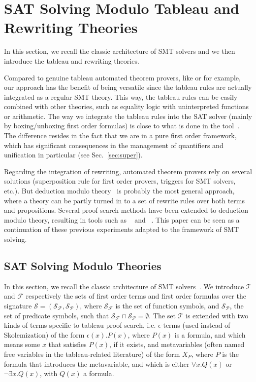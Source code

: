
\section{SAT Solving Modulo Tableau and Rewriting Theories}
\label{sec:smt}

In this section, we recall the classic architecture of SMT solvers and we then
introduce the tableau and rewriting theories.

Compared to genuine tableau automated theorem provers, like \princess{} or
\zenon{} for example, our approach has the benefit of being versatile since the
tableau rules are actually integrated as a regular SMT theory. This way, the
tableau rules can be easily combined with other theories, such as equality logic
with uninterpreted functions or arithmetic. The way we integrate the tableau
rules into the SAT solver (mainly by boxing/unboxing first order formulas) is
close to what is done in the \satallax{} tool~\cite{CEB12}. The difference
resides in the fact that we are in a pure first order framework, which has
significant consequences in the management of quantifiers and unification in
particular (see Sec.~\ref{sec:super}).

Regarding the integration of rewriting, automated theorem provers rely on
several solutions (superposition rule for first order provers, triggers for SMT
solvers, etc.). But deduction modulo theory~\cite{DA03} is probably the most
general approach, where a theory can be partly turned in to a set of rewrite
rules over both terms and propositions. Several proof search methods have been
extended to deduction modulo theory, resulting in tools such as
\iproverm{}~\cite{GB11} and \zenm{}~\cite{Zenon-Modulo}. This paper can be seen
as a continuation of these previous experiments adapted to the framework of SMT
solving.

\subsection{SAT Solving Modulo Theories}

In this section, we recall the classic architecture of SMT
solvers~\cite{BEA06}. We introduce $\mathcal{T}$ and $\mathcal{F}$ respectively
the sets of first order terms and first order formulas over the signature
$\mathcal{S}=(\mathcal{S}_\mathcal{F},\mathcal{S}_\mathcal{P})$, where
$\mathcal{S}_\mathcal{F}$ is the set of function symbols, and
$\mathcal{S}_\mathcal{P}$, the set of predicate symbols, such that
$\mathcal{S}_\mathcal{F}\cap\mathcal{S}_\mathcal{P}=\emptyset$. The set
$\mathcal{T}$ is extended with two kinds of terms specific to tableau proof
search, i.e. $\epsilon{}$-terms (used instead of Skolemization) of the form
$\epsilon(x).P(x)$, where $P(x)$ is a formula, and which means some $x$ that
satisfies $P(x)$, if it exists, and metavariables (often named free variables in
the tableau-related literature) of the form $X_P$, where $P$ is the formula that
introduces the metavariable, and which is either $\forall{}x.Q(x)$ or
$\neg\exists{}x.Q(x)$, with $Q(x)$ a formula.


